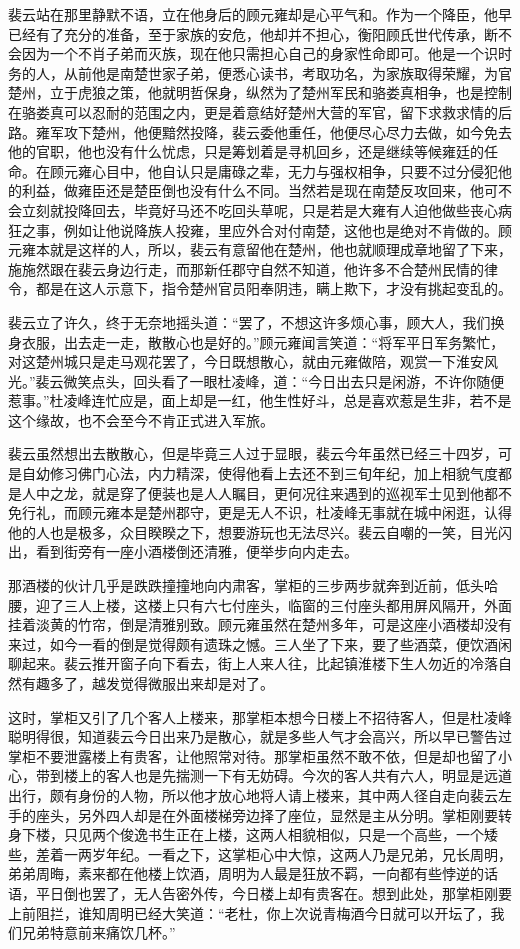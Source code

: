 裴云站在那里静默不语，立在他身后的顾元雍却是心平气和。作为一个降臣，他早已经有了充分的准备，至于家族的安危，他却并不担心，衡阳顾氏世代传承，断不会因为一个不肖子弟而灭族，现在他只需担心自己的身家性命即可。他是一个识时务的人，从前他是南楚世家子弟，便悉心读书，考取功名，为家族取得荣耀，为官楚州，立于虎狼之策，他就明哲保身，纵然为了楚州军民和骆娄真相争，也是控制在骆娄真可以忍耐的范围之内，更是着意结好楚州大营的军官，留下求救求情的后路。雍军攻下楚州，他便黯然投降，裴云委他重任，他便尽心尽力去做，如今免去他的官职，他也没有什么忧虑，只是筹划着是寻机回乡，还是继续等候雍廷的任命。在顾元雍心目中，他自认只是庸碌之辈，无力与强权相争，只要不过分侵犯他的利益，做雍臣还是楚臣倒也没有什么不同。当然若是现在南楚反攻回来，他可不会立刻就投降回去，毕竟好马还不吃回头草呢，只是若是大雍有人迫他做些丧心病狂之事，例如让他说降族人投雍，里应外合对付南楚，这他也是绝对不肯做的。顾元雍本就是这样的人，所以，裴云有意留他在楚州，他也就顺理成章地留了下来，施施然跟在裴云身边行走，而那新任郡守自然不知道，他许多不合楚州民情的律令，都是在这人示意下，指令楚州官员阳奉阴违，瞒上欺下，才没有挑起变乱的。

裴云立了许久，终于无奈地摇头道：“罢了，不想这许多烦心事，顾大人，我们换身衣服，出去走一走，散散心也是好的。”顾元雍闻言笑道：“将军平日军务繁忙，对这楚州城只是走马观花罢了，今日既想散心，就由元雍做陪，观赏一下淮安风光。”裴云微笑点头，回头看了一眼杜凌峰，道：“今日出去只是闲游，不许你随便惹事。”杜凌峰连忙应是，面上却是一红，他生性好斗，总是喜欢惹是生非，若不是这个缘故，也不会至今不肯正式进入军旅。

裴云虽然想出去散散心，但是毕竟三人过于显眼，裴云今年虽然已经三十四岁，可是自幼修习佛门心法，内力精深，使得他看上去还不到三旬年纪，加上相貌气度都是人中之龙，就是穿了便装也是人人瞩目，更何况往来遇到的巡视军士见到他都不免行礼，而顾元雍本是楚州郡守，更是无人不识，杜凌峰无事就在城中闲逛，认得他的人也是极多，众目睽睽之下，想要游玩也无法尽兴。裴云自嘲的一笑，目光闪出，看到街旁有一座小酒楼倒还清雅，便举步向内走去。

那酒楼的伙计几乎是跌跌撞撞地向内肃客，掌柜的三步两步就奔到近前，低头哈腰，迎了三人上楼，这楼上只有六七付座头，临窗的三付座头都用屏风隔开，外面挂着淡黄的竹帘，倒是清雅别致。顾元雍虽然在楚州多年，可是这座小酒楼却没有来过，如今一看的倒是觉得颇有遗珠之憾。三人坐了下来，要了些酒菜，便饮酒闲聊起来。裴云推开窗子向下看去，街上人来人往，比起镇淮楼下生人勿近的冷落自然有趣多了，越发觉得微服出来却是对了。

这时，掌柜又引了几个客人上楼来，那掌柜本想今日楼上不招待客人，但是杜凌峰聪明得很，知道裴云今日出来乃是散心，就是多些人气才会高兴，所以早已警告过掌柜不要泄露楼上有贵客，让他照常对待。那掌柜虽然不敢不依，但是却也留了小心，带到楼上的客人也是先揣测一下有无妨碍。今次的客人共有六人，明显是远道出行，颇有身份的人物，所以他才放心地将人请上楼来，其中两人径自走向裴云左手的座头，另外四人却是在外面楼梯旁边择了座位，显然是主从分明。掌柜刚要转身下楼，只见两个俊逸书生正在上楼，这两人相貌相似，只是一个高些，一个矮些，差着一两岁年纪。一看之下，这掌柜心中大惊，这两人乃是兄弟，兄长周明，弟弟周晦，素来都在他楼上饮酒，周明为人最是狂放不羁，一向都有些悖逆的话语，平日倒也罢了，无人告密外传，今日楼上却有贵客在。想到此处，那掌柜刚要上前阻拦，谁知周明已经大笑道：“老杜，你上次说青梅酒今日就可以开坛了，我们兄弟特意前来痛饮几杯。”

